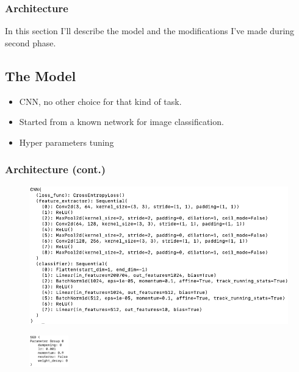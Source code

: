 \begin{frame}
    \frametitle{Architecture}
    In this section I'll describe the model and the modifications I've made during second phase.
    \subsection{The Model}
    \begin{itemize}
        \item CNN, no other choice for that kind of task.
        \item Started from a known network for image classification.
        \item Hyper parameters tuning
    \end{itemize}
\end{frame}

\begin{frame}
    \frametitle{Architecture (cont.)}
    \begin{figure}
        \includegraphics[scale=0.3]{images/architecture}
        \label{fig:architecture}
    \end{figure}

    \begin{figure}

        \includegraphics[width=0.15\textwidth]{images/optimizer}
        \label{fig:optimizer}
    \end{figure}
\end{frame}



